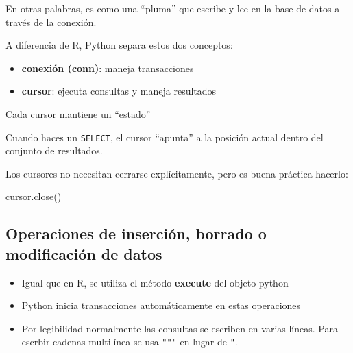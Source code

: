 \documentclass[
]{book}
\newenvironment{Shaded}{\begin{snugshade}}{\end{snugshade}}
\newcommand{\NormalTok}[1]{#1}
\providecommand{\tightlist}{%
  \setlength{\itemsep}{0pt}\setlength{\parskip}{0pt}}
\theoremstyle{break}
\theoremstyle{nonumberplain}
\begin{document}
En otras palabras, es como una ``pluma'' que escribe y lee en la base de datos a través de la conexión.

A diferencia de R, Python separa estos dos conceptos:

\begin{itemize}
\tightlist
\item
  \textbf{conexión (conn)}: maneja transacciones
\item
  \textbf{cursor}: ejecuta consultas y maneja resultados
\end{itemize}

Cada cursor mantiene un ``estado''

Cuando haces un \texttt{SELECT}, el cursor ``apunta'' a la posición actual dentro del conjunto de resultados.

Los cursores no necesitan cerrarse explícitamente, pero es buena práctica hacerlo:

\begin{Shaded}
\begin{Highlighting}[]
\NormalTok{cursor.close()}
\end{Highlighting}
\end{Shaded}

\subsection{Operaciones de inserción, borrado o modificación de datos}\label{operaciones-de-inserciuxf3n-borrado-o-modificaciuxf3n-de-datos}

\begin{itemize}
\tightlist
\item
  Igual que en R, se utiliza el método \textbf{execute} del objeto python
\item
  Python inicia transacciones automáticamente en estas operaciones
\item
  Por legibilidad normalmente las consultas se escriben en varias líneas.
  Para escrbir cadenas multilínea se usa \texttt{"""} en lugar de \texttt{"}.
\end{itemize}
\end{document}
